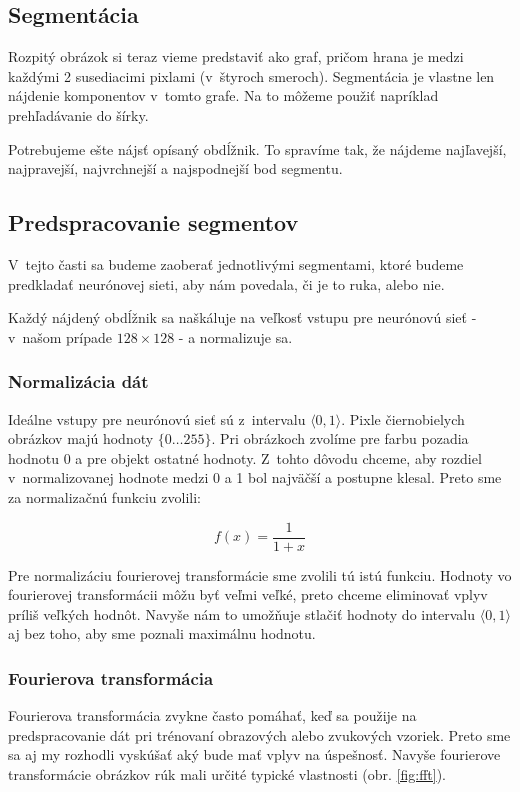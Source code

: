 \subsection{Segmentácia}\label{chap:segment}
Rozpitý obrázok si teraz vieme predstaviť ako graf, pričom hrana je medzi každými 2 susediacimi pixlami (v~štyroch smeroch). Segmentácia je vlastne len nájdenie komponentov v~tomto grafe. Na to môžeme použiť napríklad prehľadávanie do šírky. 

Potrebujeme ešte nájsť opísaný obdĺžnik. To spravíme tak, že nájdeme najľavejší, najpravejší, najvrchnejší a najspodnejší bod segmentu.

\subsection{Predspracovanie segmentov}
\label{sect:segmentpreprocessing}

V~tejto časti sa budeme zaoberať jednotlivými segmentami, ktoré budeme predkladať neurónovej sieti, aby nám povedala, či je to ruka, alebo nie.

Každý nájdený obdĺžnik sa naškáluje na veľkosť vstupu pre neurónovú sieť - v~našom prípade $128\times 128$ - a normalizuje sa. 

\subsubsection{Normalizácia dát} \label{chap:normalisation}
Ideálne vstupy pre neurónovú sieť sú z~intervalu $\langle 0,1\rangle$. Pixle čiernobielych obrázkov majú hodnoty $\{0\dots 255\}$. Pri obrázkoch zvolíme pre farbu pozadia hodnotu 0 a pre objekt ostatné hodnoty. Z~tohto dôvodu chceme, aby rozdiel v~normalizovanej hodnote medzi 0 a 1 bol najväčší a postupne klesal. Preto sme za normalizačnú funkciu zvolili:

$$f(x)=\frac{1}{1+x}$$

Pre normalizáciu fourierovej transformácie sme zvolili tú istú funkciu. Hodnoty vo fourierovej transformácii môžu byť veľmi veľké, preto chceme eliminovať vplyv príliš veľkých hodnôt. Navyše nám to umožňuje stlačiť hodnoty do intervalu $\langle 0,1\rangle$ aj bez toho, aby sme poznali maximálnu hodnotu.

\subsubsection{Fourierova transformácia} \label{chap:ft}
Fourierova transformácia zvykne často pomáhať, keď sa použije na predspracovanie dát pri trénovaní obrazových alebo zvukových vzoriek. Preto sme sa aj my rozhodli vyskúšať aký bude mať vplyv na úspešnosť. Navyše fourierove transformácie obrázkov rúk mali určité typické vlastnosti (obr. \ref{fig:fft}).

